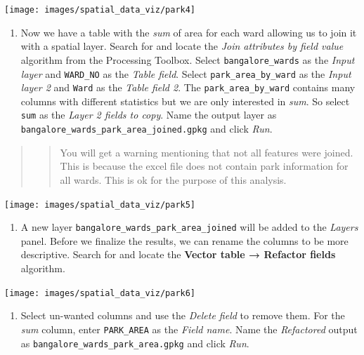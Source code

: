 \documentclass[
  12pt,
  a4paper]{article}
\providecommand{\tightlist}{%
  \setlength{\itemsep}{0pt}\setlength{\parskip}{0pt}}
\begin{document}
\begin{center}\texttt{[image: images/spatial\_data\_viz/park4]} \end{center}

\begin{enumerate}
\def\labelenumi{\arabic{enumi}.}
\setcounter{enumi}{4}
\tightlist
\item
  Now we have a table with the \emph{sum} of area for each ward allowing
  us to join it with a spatial layer. Search for and locate the
  \emph{Join attributes by field value} algorithm from the Processing
  Toolbox. Select \texttt{bangalore\_wards} as the \emph{Input layer}
  and \texttt{WARD\_NO} as the \emph{Table field}. Select
  \texttt{park\_area\_by\_ward} as the \emph{Input layer 2} and
  \texttt{Ward} as the \emph{Table field 2}. The
  \texttt{park\_area\_by\_ward} contains many columns with different
  statistics but we are only interested in \emph{sum}. So select
  \texttt{sum} as the \emph{Layer 2 fields to copy}. Name the output
  layer as \texttt{bangalore\_wards\_park\_area\_joined.gpkg} and click
  \emph{Run}.
\end{enumerate}

\begin{quote}
\begin{quote}
You will get a warning mentioning that not all features were joined.
This is because the excel file does not contain park information for all
wards. This is ok for the purpose of this analysis.
\end{quote}
\end{quote}

\begin{center}\texttt{[image: images/spatial\_data\_viz/park5]} \end{center}

\begin{enumerate}
\def\labelenumi{\arabic{enumi}.}
\setcounter{enumi}{5}
\tightlist
\item
  A new layer \texttt{bangalore\_wards\_park\_area\_joined} will be
  added to the \emph{Layers} panel. Before we finalize the results, we
  can rename the columns to be more descriptive. Search for and locate
  the \textbf{Vector table → Refactor fields} algorithm.
\end{enumerate}

\begin{center}\texttt{[image: images/spatial\_data\_viz/park6]} \end{center}

\begin{enumerate}
\def\labelenumi{\arabic{enumi}.}
\setcounter{enumi}{6}
\tightlist
\item
  Select un-wanted columns and use the \emph{Delete field} to remove
  them. For the \emph{sum} column, enter \texttt{PARK\_AREA} as the
  \emph{Field name}. Name the \emph{Refactored} output as
  \texttt{bangalore\_wards\_park\_area.gpkg} and click \emph{Run}.
\end{enumerate}
\end{document}

